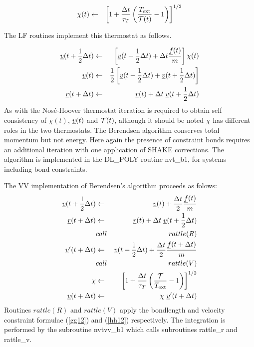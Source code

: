 \begin{eqnarray}
\chi(t) &\leftarrow& \left[ 1+ {\Delta t\over \tau_T}\left({T_{\rm ext}\over {\cal T}(t)}-1\right)
\right]^{1/2}
\end{eqnarray}

The \D{} LF routines implement this thermostat as follows.

\begin{eqnarray}
\mbox{$\underline{v}$}(t + {1\over 2} \Delta t)&\leftarrow& \left[ \mbox{$\underline{v}$}(t-{1\over 2} \Delta t) +
 \Delta t {\mbox{$\underline{f}$}(t)\over m}\right]\chi(t)\nonumber \\
\mbox{$\underline{v}$}(t)& \leftarrow& {1\over 2} \left[\mbox{$\underline{v}$}(t-{1\over 2}\Delta t)
    +\mbox{$\underline{v}$}(t+{1\over 2}\Delta t)\right]\nonumber\\
\mbox{$\underline{r}$}(t+\Delta t) &\leftarrow& \mbox{$\underline{r}$}(t) + \Delta t\; \mbox{$\underline{v}$}(t+{1\over 2}\Delta t)
\end{eqnarray}
As with the Nos\'e-Hoover thermostat iteration is required to obtain
self consistency of $\chi(t)$, $\mbox{$\underline{v}$}(t)$ and ${\cal T}(t)$,
although it should be noted $\chi$ has different roles in the two
thermostats. The Berendsen algorithm conserves total momentum but not
energy. Here again the presence of constraint bonds requires an
additional iteration with one application of SHAKE corrections.  The
algorithm is implemented in the DL\_POLY routine {\sc nvt\_b1}, for
systems including bond constraints.

The VV implementation of Berendsen's algorithm proceeds as folows:
\begin{eqnarray}
\mbox{$\underline{v}$}(t + {1\over 2} \Delta t)&\leftarrow& \mbox{$\underline{v}$}(t)
+ {\Delta t \over 2} {\mbox{$\underline{f}$}(t)\over m} \nonumber \\
\mbox{$\underline{r}$}(t+\Delta t) &\leftarrow& \mbox{$\underline{r}$}(t) + \Delta t \;
\mbox{$\underline{v}$}(t+{1\over 2}\Delta t)\nonumber \\
&call&rattle(R) \nonumber \\
\mbox{$\underline{v}$}'(t + \Delta t)&\leftarrow& \mbox{$\underline{v}$}(t + {1 \over 2}\Delta t) +
 {\Delta t \over 2} {\mbox{$\underline{f}$}(t + \Delta t)\over m} \nonumber \\
&call&rattle(V) \nonumber \\
\chi &\leftarrow& \left [1+{\Delta t \over \tau_T}\left( {{\cal
T}\over T_{\rm ext}} - 1\right) \right ]^{1/2} \nonumber \\
\mbox{$\underline{v}$}(t + \Delta t)&\leftarrow& \chi~\mbox{$\underline{v}$}'(t + \Delta t)
\end{eqnarray}
Routines $rattle(R)$ and $rattle(V)$ apply the bondlength and velocity
constraint formulae (\ref{gg12}) and (\ref{hh12}) respectively.  The
integration is performed by the subroutine {\sc nvtvv\_b1} which calls
subroutines {\sc rattle\_r} and {\sc rattle\_v}.

